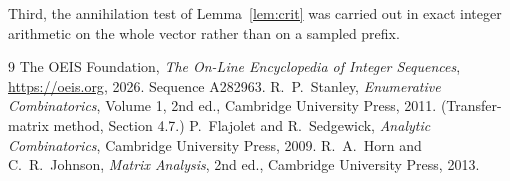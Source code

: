 \documentclass[11pt,a4paper]{article}
\theoremstyle{plain}
\theoremstyle{definition}
\begin{document}
Third, the annihilation test of Lemma~\ref{lem:crit} was carried out in exact integer
arithmetic on the whole vector rather than on a sampled prefix.

\begin{thebibliography}{9}
 The OEIS Foundation, \emph{The On-Line Encyclopedia of Integer
Sequences}, \url{https://oeis.org}, 2026. Sequence A282963.
 R.~P.~Stanley, \emph{Enumerative Combinatorics}, Volume 1, 2nd ed.,
Cambridge University Press, 2011. (Transfer-matrix method, Section 4.7.)
 P.~Flajolet and R.~Sedgewick, \emph{Analytic Combinatorics}, Cambridge
University Press, 2009.
 R.~A.~Horn and C.~R.~Johnson, \emph{Matrix Analysis}, 2nd ed., Cambridge
University Press, 2013.
\end{thebibliography}
\end{document}

